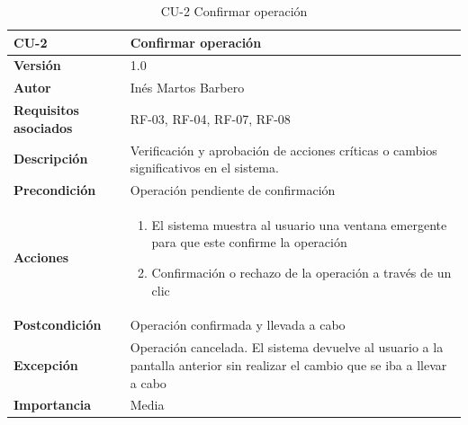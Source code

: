 \begin{table}[p]
	\centering
	\begin{tabularx}{\linewidth}{ p{} p{} }
		\toprule
		\textbf{CU-2}    & \textbf{Confirmar operación}\\
		\toprule
        \textbf{Versión}              & 1.0    \\
		\textbf{Autor}                & Inés Martos Barbero \\
		\textbf{Requisitos asociados} & RF-03, RF-04, RF-07, RF-08 \\
		\textbf{Descripción}          & Verificación y aprobación de acciones críticas o cambios significativos en el sistema. \\
		\textbf{Precondición}         & Operación pendiente de confirmación \\
		\textbf{Acciones}             &
		\begin{enumerate}
			\def\labelenumi{\arabic{enumi}.}
			\tightlist
			\item El sistema muestra al usuario una ventana emergente para que este confirme la operación
			\item Confirmación o rechazo de la operación a través de un clic
		\end{enumerate}\\
		\textbf{Postcondición}        & Operación confirmada y llevada a cabo \\
        \textbf{Excepción}            & Operación cancelada. El sistema devuelve al usuario a la pantalla anterior sin realizar el cambio que se iba a llevar a cabo \\
		\textbf{Importancia}          & Media \\
		\bottomrule
	\end{tabularx}
	\caption{CU-2 Confirmar operación}
    \label{CU-2}
\end{table}

